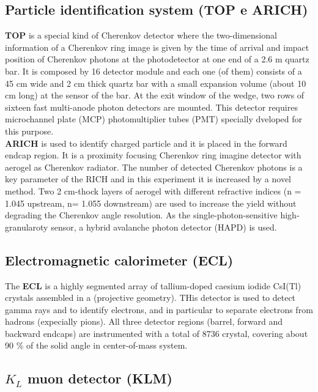 

\subsection{Particle identification system (TOP e ARICH)}

\textbf{TOP} is a special kind of Cherenkov detector where the two-dimensional information of a Cherenkov ring image is given by the time of arrival and impact position of Cherenkov photons at the photodetector at one end of a 2.6 m quartz bar. It is composed by 16 detector module and each one (of them) consists of a 45 cm wide and 2 cm thick quartz bar with a small expansion volume (about 10 cm long) at the sensor of the bar. At the exit window of the wedge, two rows of sixteen fast multi-anode photon detectors are mounted. This detector requires microchannel plate (MCP) photomultiplier tubes (PMT) specially dveloped for this purpose.\\

\textbf{ARICH} is used to identify charged particle and it is placed in the forward endcap region. It is a proximity focusing Cherenkov ring imagine detector with aerogel as Cherenkov radiator. The number of detected Cherenkov photons is a key parameter of the RICH and in this experiment it is increased by a novel method. Two 2 cm-thock layers of aerogel with different refractive indices (n = 1.045 upstream, n= 1.055 downstream) are used to increase the yield without degrading the Cherenkov angle resolution.
As the single-photon-sensitive high-granularoty sensor, a hybrid avalanche photon detector (HAPD) is used.  

\subsection{Electromagnetic calorimeter (ECL)}

The \textbf{ECL} is a highly segmented array of tallium-doped caesium iodide CsI(Tl) crystals assembled in a (projective geometry). THis detector is used to detect gamma rays and to identify electrons, and in particular to separate electrons from hadrons (expecially pions). All three detector regions (barrel, forward and backward endcaps) are instrumented with a total of 8736 crystal, covering about 90 \% of the solid angle in center-of-mass system.

\subsection{$K_{L}$ muon detector (KLM)}

